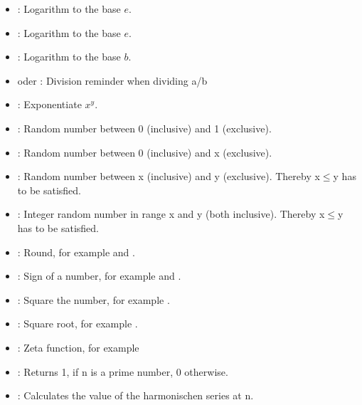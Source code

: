 \begin{itemize}
\item
{}:
Logarithm to the base $e$.

\item
{}:
Logarithm to the base $e$.

\item
{}:
Logarithm to the base $b$.

\item
{} oder :
Division reminder when dividing a/b

\item
{}:
Exponentiate $x^y$.

\item
{}:
Random number between 0 (inclusive) and 1 (exclusive).

\item
{}:
Random number between 0 (inclusive) and x (exclusive).

\item
{}:
Random number between x (inclusive) and y (exclusive). Thereby x$\le$y has to be satisfied.

\item
{}:
Integer random number in range x and y (both inclusive). Thereby x$\leq$y has to be satisfied.

\item
{}:
Round, for example  and .

\item
{}:
Sign of a number, for example  and .

\item
{}:
Square the number, for example .

\item
{}:
Square root, for example .

\item
{}:
Zeta function, for example 

\item
{}:
Returns 1, if n is a prime number, 0 otherwise.

\item
{}:
Calculates the value of the harmonischen series at n.

\end{itemize}



